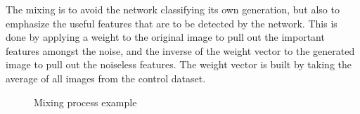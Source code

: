 \documentclass{report}
\begin{document}
The mixing is to avoid the network classifying its own generation, but also to emphasize the useful features that are to be detected by the network. This is done by applying a weight to the original image to pull out the important features amongst the noise, and the inverse of the weight vector to the generated image to pull out the noiseless features. The weight vector is built by taking the average of all images from the control dataset.

\begin{figure}
	\centering
	\caption{Mixing process example}
	\label{fig:mixing}
\end{figure}
\end{document}
